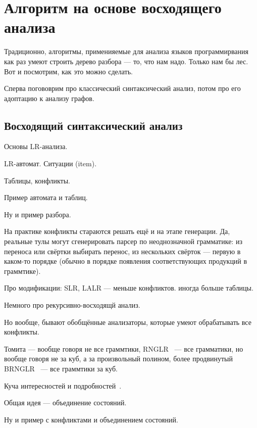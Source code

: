 \section{Алгоритм на основе восходящего анализа}

Традиционно, алгоритмы, применияемые для анализа языков программирвания как раз умеют строить дерево разбора --- то, что нам надо.
Только нам бы лес.
Вот и посмотрим, как это можно сделать.

Сперва погововрим про классический синтаксический анализ, потом про его адоптацию к анализу графов.

\subsection{Восходящий синтаксический анализ}

Основы LR-анализа.

LR-автомат. Ситуации (item).

Таблицы, конфликты.

\begin{example}
Пример автомата и таблиц.
\end{example}

\begin{example}
Ну и пример разбора.
\end{example}


На практике конфликты стараются решать ещё и на этапе генерации.
Да, реальные тулы могут сгенерировать парсер по неоднозначной грамматике: из переноса или свёртки выбирать перенос, из нескольких свёрток --- первую в каком-то порядке (обычно в порядке появления соответствующих продукций в граммтике).

Про модификации: SLR, LALR --- меньше конфликтов. иногда больше таблицы.

Немного про рекурсивно-восходящй анализ.

Но вообще, бывают обобщённые анализаторы, которые умеют обрабатывать все конфликты.

Томита --- вообще говоря не все граммтики, RNGLR~\cite{Scott:2006:RNG:1146809.1146810} --- все грамматики, но вообще говоря не за куб, а за произвольный полином, более продвинутый BRNGLR~\cite{!!!} --- все граммтики за куб.

Куча интересностей и подробностей~\cite{DBLP:phd/ethos/Economopoulos06}.

Общая идея --- объединение состояний. 

\begin{example}
Ну и пример с конфликтами и объединением состояний.
\end{example}


